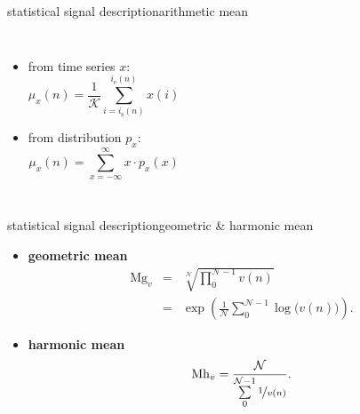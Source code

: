         \begin{frame}{statistical signal description}{arithmetic mean}
            \vspace{-7mm}
            \begin{columns}
            \begin{itemize}
                \item   from time series $x$:
                    \begin{equation*}\label{eq:arith_mean}
                        \mu_x(n) = \frac{1}{\mathcal{K}}\sum\limits_{i=i_{\mathrm{s}}(n)}^{i_{\mathrm{e}}(n)}{x(i)} 
                    \end{equation*}
                \item   from distribution $p_x$:
                    \begin{equation*}\label{eq:arith_mean2}
                        \mu_x(n) = \sum\limits_{x=-\infty}^{\infty}{x\cdot p_x(x)} 
                    \end{equation*}
            \end{itemize}
             
            \end{columns}
        \end{frame}

        \begin{frame}{statistical signal description}{geometric \& harmonic mean}
			\begin{itemize}
				\item	\textbf{geometric mean}
				\begin{eqnarray*}
					\mathrm{Mg}_v		&=& \sqrt[\mathcal{N}]{\prod\limits_{0}^{\mathcal{N}-1}{v(n)}}\label{eq:geo_mean1}\\
								&=& \exp\left({\frac{1}{\mathcal{N}}\sum\limits_{0}^{\mathcal{N}-1}{\log\big(v(n)\big)}}\right) .\label{eq:geo_mean2}
				\end{eqnarray*}
                \pause
				\item	\textbf{harmonic mean}
				\begin{equation*}
				\mathrm{Mh}_v = \frac{\mathcal{N}}{\sum\limits_{0}^{\mathcal{N}-1}{\nicefrac{1}{v(n)}}} .
				\end{equation*}
			\end{itemize}
        \end{frame}

